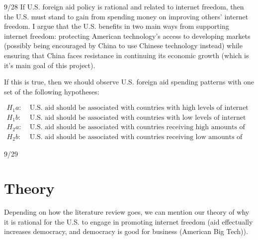 9/28
If U.S. foreign aid policy is rational and related to internet freedom, then the U.S. must stand to gain from spending money on improving others' internet freedom. I argue that the U.S. benefits in two main ways from supporting internet freedom: protecting American technology's access to developing markets (possibly being encouraged by China to use Chinese technology instead) while ensuring that China faces resistance in continuing its economic growth (which is it's main goal of this project).

If this is true, then we should observe U.S. foreign aid spending patterns with one set of the following hypotheses:

\begin{align*}
    H_1a:\; & \text{U.S. aid should be associated with countries with high levels of internet freedom.}\\
    H_1b:\; & \text{U.S. aid should be associated with countries with low levels of internet freedom.}\\
    H_2a:\; & \text{U.S. aid should be associated with countries receiving high amounts of Chinese aid.}\\
    H_2b:\; & \text{U.S. aid should be associated with countries receiving low amounts of Chinese aid.}
\end{align*}

9/29
\section*{Theory}
Depending on how the literature review goes, we can mention our theory of why it is rational for the U.S. to engage in promoting internet freedom (aid effectually increases democracy, and democracy is good for business (American Big Tech)).